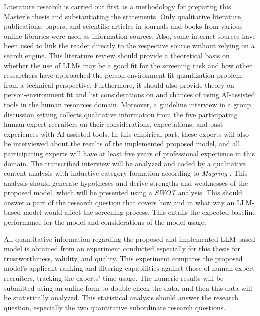 \documentclass[draft,final]{thesisclass} %
\begin{document}
Literature research is carried out first as a methodology for preparing this Master's thesis and substantiating the statements.
Only qualitative literature, publications, papers, and scientific articles in journals and books from various online libraries were used as information sources.
Also, some internet sources have been used to link the reader directly to the respective source without relying on a search engine.
This literature review should provide a theoretical basis on whether the use of \gls{LLM}s may be a good fit for the screening task and how other researchers have approached the person-environment fit quantization problem from a technical perspective.
Furthermore, it should also provide theory on person-environment fit and list considerations on and chances of using \acs{AI}-assisted tools in the human resources domain.
Moreover, a guideline interview in a group discussion setting collects qualitative information from the five participating human expert recruiters on their considerations, expectations, and past experiences with \acs{AI}-assisted tools.
In this empirical part, these experts will also be interviewed about the results of the implemented proposed model, and all participating experts will have at least five years of professional experience in this domain.
The transcribed interview will be analyzed and coded by a qualitative content analysis with inductive category formation according to \textit{Mayring} \parencite{mayring}.
This analysis should generate hypotheses and derive strengths and weaknesses of the proposed model, which will be presented using a \textit{SWOT} analysis.
This should answer a part of the research question that covers how and in what way an \gls{LLM}-based model would affect the screening process.
This entails the expected baseline performance for the model and considerations of the model usage.

All quantitative information regarding the proposed and implemented \gls{LLM}-based model is obtained from an experiment conducted especially for this thesis for trustworthiness, validity, and quality.
This experiment compares the proposed model's applicant ranking and filtering capabilities against those of human expert recruiters, tracking the experts' time usage.
The numeric results will be submitted using an online form to double-check the data, and then this data will be statistically analyzed.
This statistical analysis should answer the research question, especially the two quantitative subordinate research questions.
\end{document}
